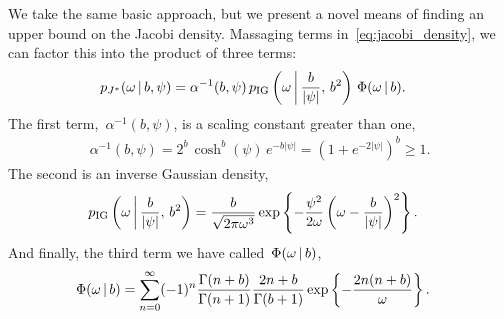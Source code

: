 We take the same basic approach, but we present a novel means of
finding an upper bound on the Jacobi density.  Massaging terms
in~\eqref{eq:jacobi_density}, we can factor this into the product of
three terms:
\begin{align*}
  p_{J^{*}}({\omega} \,|\, b,\psi) &= 
   \alpha^{-1}(b,\psi) \,
   p_{\mathrm{IG}}\left({\omega} \, \bigg| \, \frac{b}{|\psi|}, \, b^2 \right) \,
   \Phi({\omega} \,|\, b).
\end{align*}
The first term,~$\alpha^{-1}(b,\psi)$, is a scaling constant greater than one,
\begin{align*}
  \alpha^{-1}(b,\psi) = 2^b \, \cosh^b(\psi) \, e^{-b|\psi|} 
  = \left(1 + e^{-2|\psi|} \right)^b \geq 1.
\end{align*}
The second is an inverse Gaussian density,
\begin{align*}
p_{\mathrm{IG}} \left({\omega} \, \bigg| \, \frac{b}{|\psi|}, \, b^2 \right) 
  &= \frac{b}{\sqrt{2\pi {\omega}^3}}
    \exp \left \{ - \frac{\psi^2}{2{\omega}}  \left({\omega} - \frac{b}{|\psi|} \right)^2   \right \}.
\end{align*}
And finally, the third term we have called~$\Phi({\omega} \,|\, b)$, 
\begin{align*}
  \Phi({\omega} \,|\, b)  
  &= \sum_{n=0}^\infty (-1)^n \frac{\Gamma(n+b)}{\Gamma(n+1)} \frac{2n+b}{\Gamma(b+1)}
    \exp\left\{- \frac{2n(n+b)}{{\omega}} \right\}.  
\end{align*}


